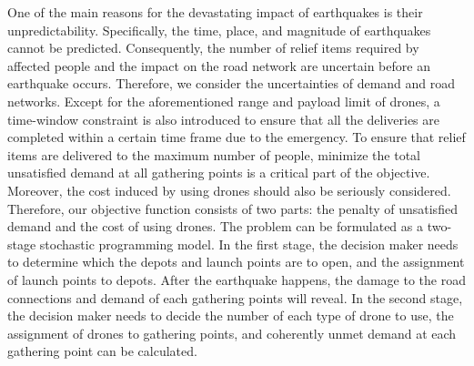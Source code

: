 \documentclass[preprint,review,11pt,authoryear]{elsarticle}
\begin{document}
One of the main reasons for the devastating impact of earthquakes is their unpredictability. Specifically, the time, place, and magnitude of earthquakes cannot be predicted. Consequently, the number of relief items required by affected people and the impact on the road network are uncertain before an earthquake occurs. Therefore, we consider the uncertainties of demand and road networks. Except for the aforementioned range and payload limit of drones, a time-window constraint is also introduced to ensure that all the deliveries are completed within a certain time frame due to the emergency. To ensure that relief items are delivered to the maximum number of people, minimize the total unsatisfied demand at all gathering points is a critical part of the objective. Moreover, the cost induced by using drones should also be seriously considered. Therefore, our objective function consists of two parts: the penalty of unsatisfied demand and the cost of using drones. The problem can be formulated as a two-stage stochastic programming model. In the first stage, the decision maker needs to determine which the depots and launch points are to open, and the assignment of launch points to depots. After the earthquake happens, the damage to the road connections and demand of each gathering points will reveal. In the second stage, the decision maker needs to decide the number of each type of drone to use, the assignment of drones to gathering points, and coherently unmet demand at each gathering point can be calculated.
\end{document}
